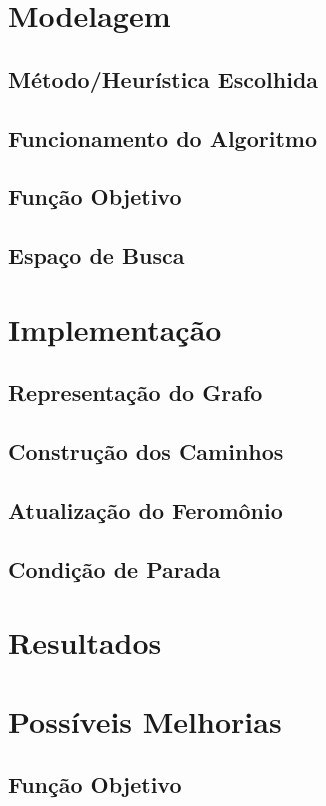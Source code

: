 \documentclass{article}
\begin{document}
\section{Modelagem}
\subsection{Método/Heurística Escolhida}
\subsection{Funcionamento do Algoritmo}
\subsection{Função Objetivo}
\subsection{Espaço de Busca}

\section{Implementação}
\subsection{Representação do Grafo}
\subsection{Construção dos Caminhos}
\subsection{Atualização do Feromônio}
\subsection{Condição de Parada}

\section{Resultados}

\section{Possíveis Melhorias}
\subsection{Função Objetivo}
\end{document}
